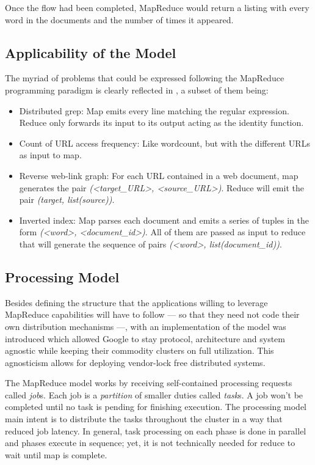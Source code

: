 Once the flow had been completed, MapReduce would return a listing with every word in the documents and the number of times it appeared.

\subsection{Applicability of the Model}\label{subsec:aplicabilidad}
\noindent The myriad of problems that could be expressed following the MapReduce programming paradigm is clearly reflected in \cite{googlemapreduce}, a subset of them being:

\begin{itemize}
 \item Distributed grep: Map emits every line matching the regular expression. Reduce only forwards its input to its output acting as the identity function.
 \item Count of URL access frequency: Like wordcount, but with the different URLs as input to map.
 \item Reverse web-link graph: For each URL contained in a web document, map generates the pair \emph{(<target\_URL>, <source\_URL>)}. Reduce will emit the pair \emph{(target, list(source))}.
 \item Inverted index: Map parses each document and emits a series of tuples in the form \emph{(<word>, <document\_id>)}. All of them are passed as input to reduce that will generate the sequence of pairs \emph{(<word>, list(document\_id))}.
\end{itemize}

\subsection{Processing Model}\label{subsec:processingmodel}
\noindent Besides defining the structure that the applications willing to leverage MapReduce capabilities will have to follow --- so that they need not code their own distribution mechanisms ---, with \cite{googlemapreduce} an implementation of the model was introduced which allowed Google to stay protocol, architecture and system agnostic while keeping their commodity clusters on full utilization. This agnosticism allows for deploying vendor-lock free distributed systems.

The MapReduce model works by receiving self-contained processing requests called \emph{job}s. Each job is a \emph{partition} of smaller duties called \emph{task}s. A job won't be completed until no task is pending for finishing execution. The processing model main intent is to distribute the tasks throughout the cluster in a way that reduced job latency. In general, task processing on each phase is done in parallel and phases execute in sequence; yet, it is not technically needed for reduce to wait until map is complete.

